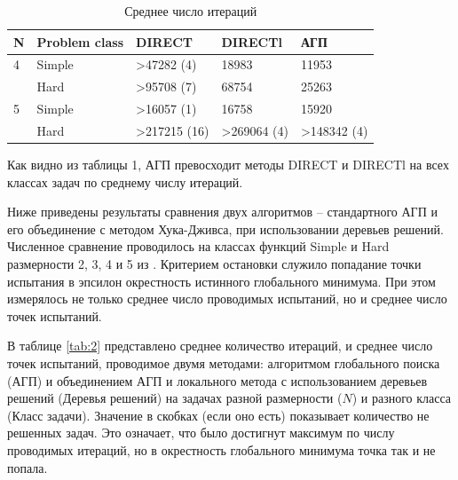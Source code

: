 \documentclass[12pt, a4paper, russian]{article}
\begin{document}
\begin{table}[!ht]
    \caption{Среднее число итераций}
    \label{tab:1}
    \centering
    \begin{tabular}{|l|l|l|l|l|}
    \hline
        N & Problem class & DIRECT & DIRECTl & АГП  \\ \hline
        4 & Simple & >47282 (4) & 18983 & 11953  \\ \hline
        ~ & Hard & >95708 (7) & 68754 & 25263  \\ \hline
        5 & Simple & >16057 (1) & 16758 & 15920  \\ \hline
        ~ & Hard & >217215 (16) & >269064 (4) & >148342 (4)  \\ \hline
    \end{tabular}
\end{table}

Как видно из таблицы 1, АГП превосходит методы DIRECT и DIRECTl на всех классах задач по среднему числу итераций. 

Ниже приведены результаты сравнения двух алгоритмов – стандартного АГП и его объединение с методом Хука-Дживса, при использовании деревьев решений. Численное сравнение проводилось на классах функций Simple и Hard размерности 2, 3, 4 и 5 из \cite{fio_bib19}. Критерием остановки служило попадание точки испытания в эпсилон окрестность истинного глобального минимума. 
При этом измерялось не только среднее число проводимых испытаний, но и среднее число точек испытаний.

В таблице \ref{tab:2} представлено среднее количество итераций, и среднее число точек испытаний, проводимое двумя методами: алгоритмом глобального поиска (АГП) и объединением АГП и локального метода с использованием деревьев решений (Деревья решений) на задачах разной размерности ($N$) и разного класса (Класс задачи). Значение в скобках (если оно есть) показывает количество не решенных задач. Это означает, что было достигнут максимум по числу проводимых итераций, но в окрестность глобального минимума точка так и не попала.
\end{document}
